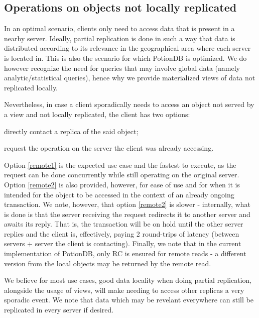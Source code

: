 \documentclass{vldb}
\begin{document}
\fi

\subsection{Operations on objects not locally replicated}
\label{subsec:operationsNonLocal}

In an optimal scenario, clients only need to access data that is present in a nearby server.
Ideally, partial replication is done in such a way that data is distributed according to its relevance in the geographical area where each server is located in.
This is also the scenario for which PotionDB is optimized.
We do however recognize the need for queries that may involve global data (namely analytic/statistical queries), hence why we provide materialized views of data not replicated locally.

Nevertheless, in case a client sporadically needs to access an object not served by a view and not locally replicated, the client has two options:
\begin{enumerate*}[label=(\roman*)]
	\item \label{remote1}directly contact a replica of the said object; 
	\item \label{remote2}request the operation on the server the client was already accessing.
\end{enumerate*}

Option \ref{remote1} is the expected use case and the fastest to execute, as the request can be done concurrently while still operating on the original server.
Option \ref{remote2} is also provided, however, for ease of use and for when it is intended for the object to be accessed in the context of an already ongoing transaction.
We note, however, that option \ref{remote2} is slower - internally, what is done is that the server receiving the request redirects it to another server and awaits its reply.
That is, the transaction will be on hold until the other server replies and the client is, effectively, paying 2 round-trips of latency (between servers + server the client is contacting).
Finally, we note that in the current implementation of PotionDB, only RC is ensured for remote reads - a different version from the local objects may be returned by the remote read.

We believe for most use cases, good data locality when doing partial replication, alongside the usage of views, will make needing to access other replicas a very sporadic event.
We note that data which may be revelant everywhere can still be replicated in every server if desired.
\end{document}
